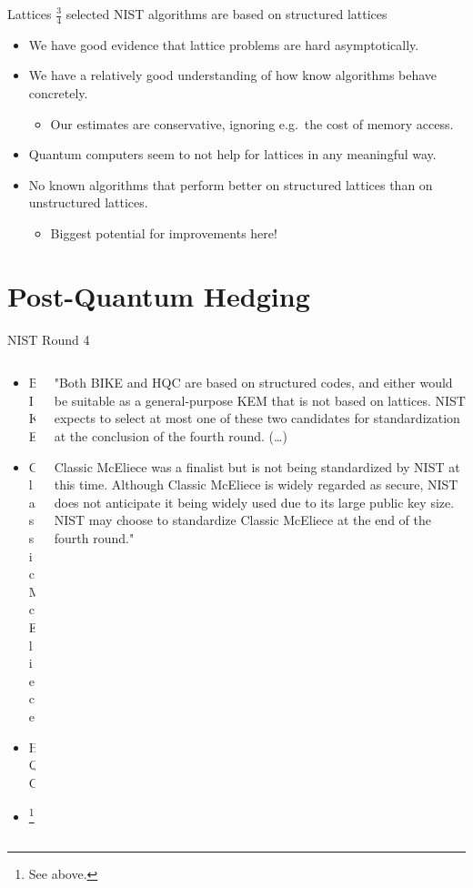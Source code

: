 \documentclass[xcolor=table,10pt,aspectratio=169]{beamer}
\begin{document}
\begin{frame}[label={sec:orgfb24544}]{Lattices}
\(\frac{3}{4}\) selected NIST algorithms are based on structured lattices

\begin{itemize}
\item We have good evidence that lattice problems are hard asymptotically.
\item We have a relatively good understanding of how know algorithms behave concretely.
\begin{itemize}
\item Our estimates are conservative, ignoring e.g. the cost of memory access.
\end{itemize}
\item Quantum computers seem to not help for lattices in any meaningful way.
\item No known algorithms that perform better on structured lattices than on unstructured lattices.
\begin{itemize}
\item Biggest potential for improvements here!
\end{itemize}
\end{itemize}
\end{frame}
\section{Post-Quantum Hedging}
\label{sec:org5072443}
\begin{frame}[label={sec:orgba6c9f7}]{NIST Round 4}
\begin{columns}
\begin{column}{0.3\columnwidth}
\begin{itemize}
\item BIKE
\item Classic McEliece
\item HQC
\item {\color{lightgray}{SIKE}}\footnote{See above.}
\end{itemize}
\end{column}

\begin{column}{0.7\columnwidth}
"Both BIKE and HQC are based on structured codes, and either would be suitable as a general-purpose KEM that is not based on lattices. NIST expects to select at most one of these two candidates for standardization at the conclusion of the fourth round. (…)

Classic McEliece was a finalist but is not being standardized by NIST at this time. Although Classic McEliece is widely regarded as secure, NIST does not anticipate it being widely used due to its large public key size. NIST may choose to standardize Classic McEliece at the end of the fourth round."
\end{column}
\end{columns}
\end{frame}
\end{document}

